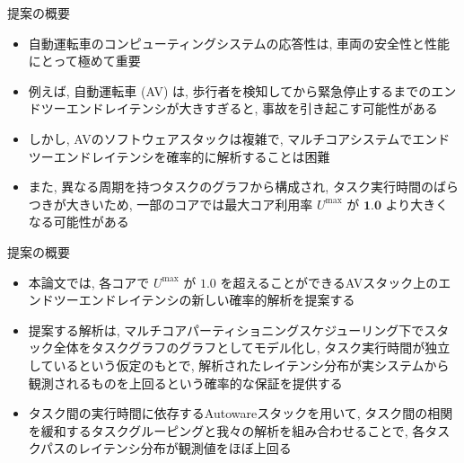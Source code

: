 
\begin{frame}{提案の概要}
    \begin{itemize}
        \item 自動運転車のコンピューティングシステムの応答性は, 車両の安全性と性能にとって極めて重要
        \item 例えば, 自動運転車 (AV) は, 歩行者を検知してから緊急停止するまでのエンドツーエンドレイテンシが大きすぎると, 事故を引き起こす可能性がある
        \item しかし, AVのソフトウェアスタックは複雑で, マルチコアシステムでエンドツーエンドレイテンシを確率的に解析することは困難
        \item また, 異なる周期を持つタスクのグラフから構成され, タスク実行時間のばらつきが大きいため, 一部のコアでは最大コア利用率 $U^{\max }$ が $\mathbf{1 . 0}$ より大きくなる可能性がある
    \end{itemize}
\end{frame}

\begin{frame}{提案の概要}
    \begin{itemize}
        \item 本論文では, 各コアで $U^{\max }$ が $1.0$ を超えることができるAVスタック上のエンドツーエンドレイテンシの新しい確率的解析を提案する
        \item 提案する解析は, マルチコアパーティショニングスケジューリング下でスタック全体をタスクグラフのグラフとしてモデル化し, タスク実行時間が独立しているという仮定のもとで, 解析されたレイテンシ分布が実システムから観測されるものを上回るという確率的な保証を提供する
        \item タスク間の実行時間に依存するAutowareスタックを用いて, タスク間の相関を緩和するタスクグルーピングと我々の解析を組み合わせることで, 各タスクパスのレイテンシ分布が観測値をほぼ上回る
    \end{itemize}
\end{frame}

